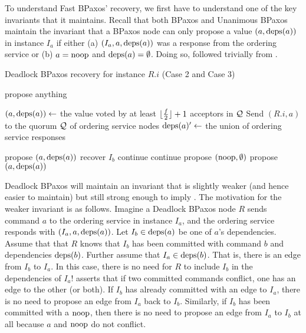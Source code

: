 To understand Fast
BPaxos' recovery, we first have to understand one of the key invariants that it
maintains. Recall that both BPaxos and Unanimous BPaxos maintain the invariant
that a BPaxos node can only propose a value $(a, \text{deps}(a))$ in instance $I_a$
if either (a) $(I_a, a, \text{deps}(a))$ was a response from the ordering service or
(b) $a = \text{noop}$ and $\text{deps}(a) = \emptyset$. Doing so,
 followed trivially from .

\begin{algorithm}
  \caption{Deadlock BPaxos recovery for instance $R.i$ (Case 2 and Case 3)}%
  \begin{algorithmic}[1]
      \State{} propose anything
    \EndIf{}

    \State{}
    \State{} $(a, \text{deps}(a)) \gets$ the value voted by at least
             $\lfloor\frac{f}{2}\rfloor + 1$ acceptors in $\mathcal{Q}$
    \State{} Send $(R.i, a)$ to the quorum $\mathcal{Q}$ of ordering service nodes
    \State{} $\text{deps}(a)' \gets$ the union of ordering service responses

    \State{}
      \State{} propose $(a, \text{deps}(a))$
    \EndIf{}
        \State{} recover $I_b$
      \EndIf
        \State{} continue
      \EndIf{}
        \State{} continue
      \EndIf{}
        \State{} propose $(\text{noop}, \emptyset)$
      \EndIf{}
    \EndFor{}
    \State{} propose $(a, \text{deps}(a))$
  \end{algorithmic}
\end{algorithm}

Deadlock BPaxos will maintain an invariant that is slightly weaker (and hence
easier to maintain) but still strong enough to imply
. The motivation for the weaker invariant is as
follows. Imagine a Deadlock BPaxos node $R$ sends command $a$ to the ordering
service in instance $I_a$, and the ordering service responds with $(I_a, a,
\text{deps}(a))$. Let $I_b \in \text{deps}(a)$ be one of $a$'s dependencies. Assume that
that $R$ knows that $I_b$ has been committed with command $b$ and dependencies
$\text{deps}(b)$. Further assume that $I_a \in \text{deps}(b)$. That is, there is an edge
from $I_b$ to $I_a$. In this case, there is no need for $R$ to include $I_b$ in
the dependencies of $I_a$!  asserts that if two
committed commands conflict, one has an edge to the other (or both). If $I_b$
has already committed with an edge to $I_a$, there is no need to propose an
edge from $I_a$ back to $I_b$.
%
Similarly, if $I_b$ has been committed with a $\text{noop}$, then there is no need to
propose an edge from $I_a$ to $I_b$ at all because $a$ and $\text{noop}$ do not
conflict.

